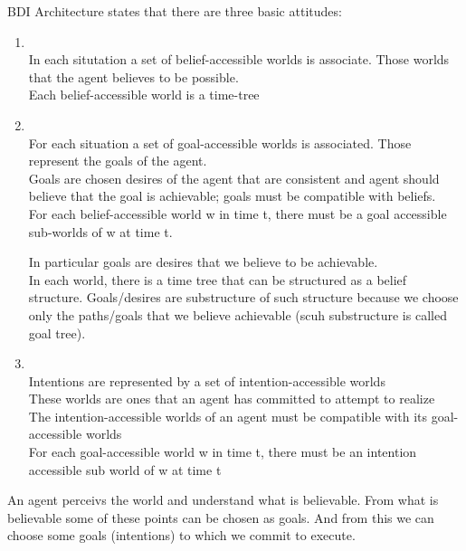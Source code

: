 BDI Architecture states that there are three basic attitudes:
\begin{enumerate}
\item {}\\
In each situtation a set of belief-accessible worlds is associate. Those worlds that the agent believes to be possible.\\
Each belief-accessible world is a time-tree
\item {}\\
For each situation a set of goal-accessible worlds is associated. Those represent the goals of the agent.\\
Goals are chosen desires of the agent that are consistent and agent should believe that the goal is achievable; goals must be compatible with beliefs.\\
For each belief-accessible world w in time t, there must be a goal accessible sub-worlds of w at time t.

In particular goals are desires that we believe to be achievable.\\
In each world, there is a time tree that can be structured as a belief structure. Goals/desires are substructure of such structure  because we choose only the paths/goals that we believe achievable (scuh substructure is called goal tree).
\item {}\\
Intentions are represented by a set of intention-accessible worlds\\
These worlds are ones that an agent has committed to attempt to realize\\
The intention-accessible worlds of an agent must be compatible with its goal-accessible worlds\\
For each goal-accessible world w in time t, there must be an intention accessible sub world of w at time t
\end{enumerate}

An agent perceivs the world and understand what is believable.
From what is believable some of these points can be chosen as goals. And from this we can choose some goals (intentions) to which we commit to execute.